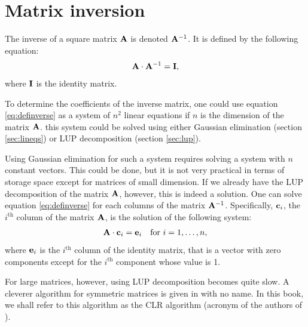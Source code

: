 \documentclass[twoside]{book}
\begin{document}
\section{Matrix inversion}
\label{sec:matrixinversion} The inverse of a square matrix ${\bf
A}$ is denoted ${\bf A}^{-1}$. It is defined by the following
equation:
\begin{equation}
\label{eq:definverse} {\bf A}\cdot{\bf A}^{-1}={\bf I},
\end{equation}
where ${\bf I}$ is the identity matrix.

To determine the coefficients of the inverse matrix, one could use
equation \ref{eq:definverse} as a system of $n^2$ linear equations
if $n$ is the dimension of the matrix ${\bf A}$. this system could
be solved using either Gaussian elimination (\cf section
\ref{sec:lineqs}) or LUP decomposition (\cf section
\ref{sec:lup}).

Using Gaussian elimination for such a system requires solving a
system with $n$ constant vectors. This could be done, but it is
not very practical in terms of storage space except for matrices
of small dimension. If we already have the LUP decomposition of
the matrix ${\bf A}$, however, this is indeed a solution. One can
solve equation \ref{eq:definverse} for each columns of the matrix
${\bf A}^{-1}$. Specifically, ${\bf c}_i$, the $i^{\mathop{th}}$
column of the matrix ${\bf A}$, is the solution of the following
system:
\begin{equation}
  {\bf A}\cdot{\bf c}_i={\bf e}_i\mbox{\quad for $i=1,\ldots,n$},
\end{equation}
where ${\bf e}_i$ is the $i^{\mathop{th}}$ column of the identity
matrix, that is a vector with zero components except for the
$i^{\mathop{th}}$ component whose value is 1.

For large matrices, however, using LUP decomposition becomes quite
slow. A cleverer algorithm for symmetric matrices is given in
\cite{CorLeiRiv} with no name. In this book, we shall refer to
this algorithm as the CLR algorithm (acronym of the authors of
\cite{CorLeiRiv}).
\end{document}
